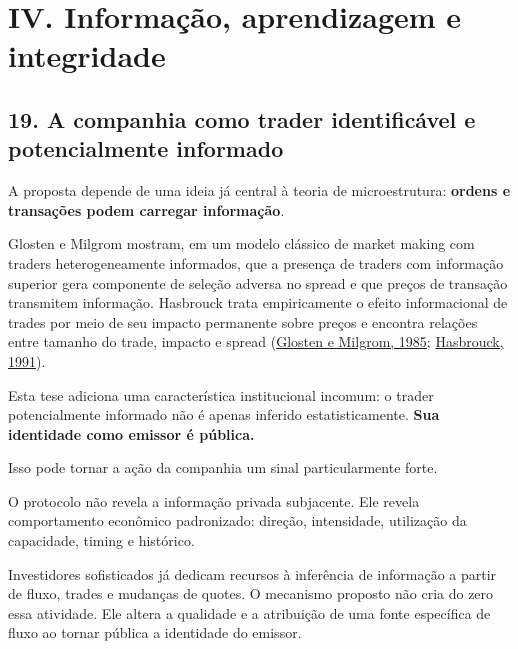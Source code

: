 \documentclass[
  a4paper,
]{article}
\begin{document}
\hypertarget{iv-informacao-aprendizagem-e-integridade}{}

\hypertarget{iv-informauxe7uxe3o-aprendizagem-e-integridade-1}{%
\section{IV. Informação, aprendizagem e
integridade}\label{iv-informauxe7uxe3o-aprendizagem-e-integridade-1}}

\hypertarget{19-a-companhia-como-trader-identificavel-e-potencialmente-informado}{}

\hypertarget{19-a-companhia-como-trader-identificuxe1vel-e-potencialmente-informado}{%
\subsection{19. A companhia como trader identificável e potencialmente
informado}\label{19-a-companhia-como-trader-identificuxe1vel-e-potencialmente-informado}}

A proposta depende de uma ideia já central à teoria de microestrutura:
\textbf{ordens e transações podem carregar informação}.

Glosten e Milgrom mostram, em um modelo clássico de market making com
traders heterogeneamente informados, que a presença de traders com
informação superior gera componente de seleção adversa no spread e que
preços de transação transmitem informação. Hasbrouck trata empiricamente
o efeito informacional de trades por meio de seu impacto permanente
sobre preços e encontra relações entre tamanho do trade, impacto e
spread (\protect\hyperlink{ref-4}{Glosten e Milgrom, 1985};
\protect\hyperlink{ref-5}{Hasbrouck, 1991}).

Esta tese adiciona uma característica institucional incomum: o trader
potencialmente informado não é apenas inferido estatisticamente.
\textbf{Sua identidade como emissor é pública.}

Isso pode tornar a ação da companhia um sinal particularmente forte.

O protocolo não revela a informação privada subjacente. Ele revela
comportamento econômico padronizado: direção, intensidade, utilização da
capacidade, timing e histórico.

Investidores sofisticados já dedicam recursos à inferência de informação
a partir de fluxo, trades e mudanças de quotes. O mecanismo proposto não
cria do zero essa atividade. Ele altera a qualidade e a atribuição de
uma fonte específica de fluxo ao tornar pública a identidade do emissor.
\end{document}
